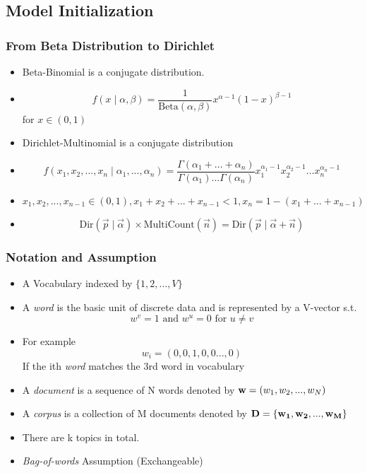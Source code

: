 \documentclass{beamer}
\begin{document}
\subsection{Model Initialization}
\begin{frame}
\frametitle{From Beta Distribution to Dirichlet}
\begin{itemize}
\item Beta-Binomial is a conjugate distribution.
\item $$f(x\mid \alpha, \beta) = \frac{1}{\text{Beta}(\alpha,\beta)}x^{\alpha - 1}(1-x)^{\beta - 1}$$ for $x \in (0,1)$
\item Dirichlet-Multinomial is a conjugate distribution
\item $$f(x_1, x_2, ... , x_n \mid \alpha_1, ...,\alpha_n) = \frac{\Gamma (\alpha_1 + ... + \alpha_n)}{\Gamma (\alpha_1)...\Gamma (\alpha_n)}x_{1}^{\alpha_1 - 1}x_{2}^{\alpha_2 - 1}...x_{n}^{\alpha_n - 1}$$
\item $x_1,x_2,...,x_{n-1} \in (0,1) , x_1+x_2+...+x_{n-1} < 1 , x_n = 1 - (x_1 + ... + x_{n-1})$
\item $$ \text{Dir}(\vec{p} \mid \vec{\alpha}) \times \text{MultiCount}(\vec{n}) =  \text{Dir}(\vec{p} \mid \vec{\alpha} + \vec{n})$$
\end{itemize}
\end{frame}

\begin{frame}
\frametitle{Notation and Assumption}
\begin{itemize}
\item A Vocabulary indexed by $\{1,2,...,V\}$
\item A {\em word} is the basic unit of discrete data and is represented by a V-vector s.t. $$w^v = 1 \text{ and } w^u = 0 \text{ for } u \neq v$$
\item For example $$w_i = (0,0,1,0,0...,0)$$ If the ith {\em word}  matches the 3rd word in vocabulary
\item A {\em document} is a sequence of N words denoted by ${\bf w} = (w_1,w_2,...,w_N)$
\item A {\em corpus} is a collection of M documents denoted by ${\bf D} = \{ {\bf w_1},{\bf w_2},...,{\bf w_M} \}$
\item There are k topics in total.
\item {\em Bag-of-words} Assumption (Exchangeable)
\end{itemize}
\end{frame}
\end{document}
